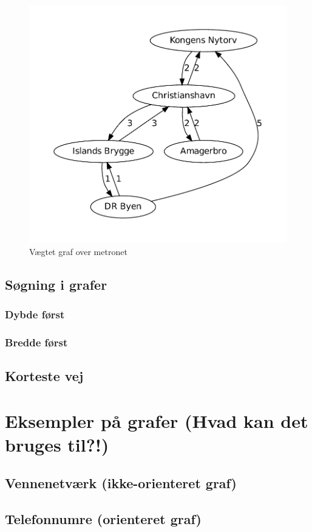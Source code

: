 \documentclass[10pt,a4paper,danish]{article}
\begin{document}
\begin{figure}[h]
\centering
\includegraphics[width=.75\textwidth]{graphs/metro2.pdf}
\caption{Vægtet graf over metronet}
\label{fig:metro2}
\end{figure}




\subsection{Søgning i grafer}
\subsubsection{Dybde først}
\subsubsection{Bredde først}
\subsection{Korteste vej}


\section{Eksempler på grafer (Hvad kan det bruges til?!)}
\subsection{Vennenetværk (ikke-orienteret graf)}
\subsection{Telefonnumre (orienteret graf)}
\end{document}
